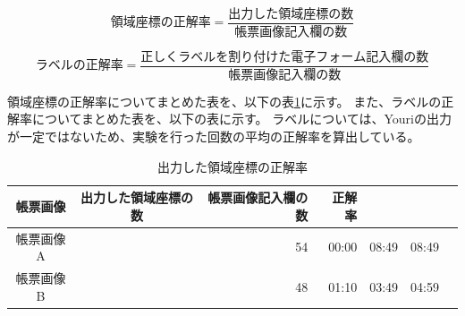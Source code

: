 
\begin{equation}
    領域座標の正解率=\frac{出力した領域座標の数}{帳票画像記入欄の数}
\end{equation}

\begin{equation}
    ラベルの正解率=\frac{正しくラベルを割り付けた電子フォーム記入欄の数}{帳票画像記入欄の数}
\end{equation}

領域座標の正解率についてまとめた表を、以下の表\ref{tb:result_rect_accuracy}に示す。
また、ラベルの正解率についてまとめた表を、以下の表に示す。
ラベルについては、Youriの出力が一定ではないため、実験を行った回数の平均の正解率を算出している。

\begin{table}[t]
	\caption{出力した領域座標の正解率}
	\label{tb:result_rect_accuracy}
	\centering
	\begin{tabular}{cc||rrrr|r}
		帳票画像 & 出力した領域座標の数 & 帳票画像記入欄の数 & 正解率 \\
        \hline \hline
        帳票画像A &  & 54 & 00:00 & 08:49 & 08:49 \\
        帳票画像B &  & 48 & 01:10 & 03:49 & 04:59 \\
        \hline
	\end{tabular}
\end{table}







